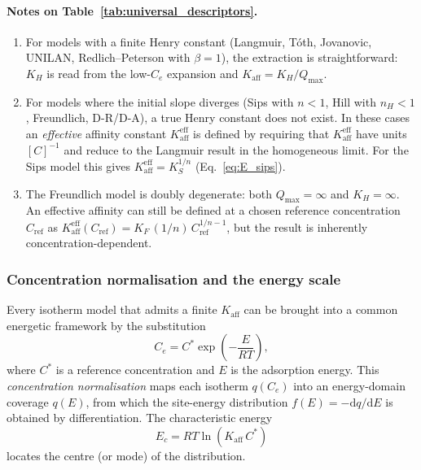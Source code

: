 	\paragraph{Notes on Table~\ref{tab:universal_descriptors}.}

	\begin{enumerate}
		\item For models with a finite Henry constant (Langmuir, T\'oth,
		Jovanovic, UNILAN, Redlich--Peterson with $\beta = 1$), the
		extraction is straightforward: $K_H$ is read from the low-$C_e$
		expansion and $K_{\mathrm{aff}} = K_H / Q_{\max}$.

		\item For models where the initial slope diverges (Sips with
		$n < 1$, Hill with $n_H < 1$, Freundlich, D-R/D-A), a true
		Henry constant does not exist.  In these cases an
		\emph{effective} affinity constant
		$K_{\mathrm{aff}}^{\mathrm{eff}}$ is defined by requiring
		that $K_{\mathrm{aff}}^{\mathrm{eff}}$ have units $[C]^{-1}$
		and reduce to the Langmuir result in the homogeneous limit.
		For the Sips model this gives
		$K_{\mathrm{aff}}^{\mathrm{eff}} = K_S^{1/n}$
		(Eq.~\eqref{eq:E_sips}).

		\item The Freundlich model is doubly degenerate: both
		$Q_{\max} = \infty$ and $K_H = \infty$.  An effective
		affinity can still be defined at a chosen reference
		concentration $C_{\mathrm{ref}}$ as
		$K_{\mathrm{aff}}^{\mathrm{eff}}(C_{\mathrm{ref}})
		= K_F\,(1/n)\,C_{\mathrm{ref}}^{1/n - 1}$,
		but the result is inherently concentration-dependent.
	\end{enumerate}

	\subsubsection{Concentration normalisation and the energy scale}

	Every isotherm model that admits a finite $K_{\mathrm{aff}}$ can be
	brought into a common energetic framework by the substitution
	\begin{equation}
		C_e = C^{\ast}\exp\!\left(-\frac{E}{RT}\right),
		\label{eq:conc_norm_general}
	\end{equation}
	where $C^{\ast}$ is a reference concentration and $E$ is the
	adsorption energy.  This \emph{concentration normalisation} maps
	each isotherm $q(C_e)$ into an energy-domain coverage $q(E)$,
	from which the site-energy distribution
	$f(E) = -\mathrm{d}q/\mathrm{d}E$ is obtained by
	differentiation.  The characteristic energy
	\begin{equation}
		E_c = RT\ln(K_{\mathrm{aff}}\,C^{\ast})
	\end{equation}
	locates the centre (or mode) of the distribution.

